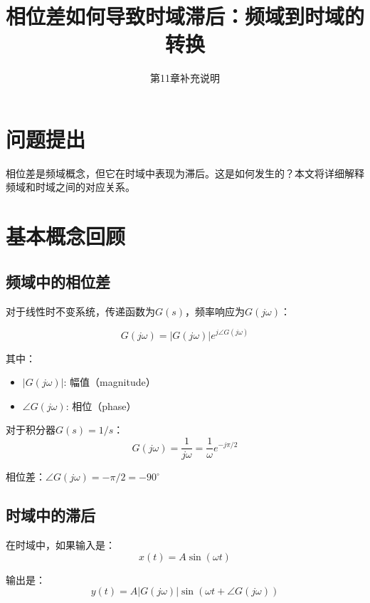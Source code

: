 \documentclass[12pt,a4paper]{article}
\title{相位差如何导致时域滞后：频域到时域的转换}
\author{第11章补充说明}
\date{}
\begin{document}
\maketitle

\section{问题提出}

相位差是频域概念，但它在时域中表现为滞后。这是如何发生的？本文将详细解释频域和时域之间的对应关系。

\section{基本概念回顾}

\subsection{频域中的相位差}

对于线性时不变系统，传递函数为$G(s)$，频率响应为$G(j\omega)$：

\begin{equation}
G(j\omega) = |G(j\omega)| e^{j\angle G(j\omega)}
\end{equation}

其中：
\begin{itemize}
\item $|G(j\omega)|$: 幅值（magnitude）
\item $\angle G(j\omega)$: 相位（phase）
\end{itemize}

对于积分器$G(s) = 1/s$：
\begin{equation}
G(j\omega) = \frac{1}{j\omega} = \frac{1}{\omega} e^{-j\pi/2}
\end{equation}

相位差：$\angle G(j\omega) = -\pi/2 = -90^\circ$

\subsection{时域中的滞后}

在时域中，如果输入是：
\begin{equation}
x(t) = A\sin(\omega t)
\end{equation}

输出是：
\begin{equation}
y(t) = A|G(j\omega)|\sin(\omega t + \angle G(j\omega))
\end{equation}
\end{document}
